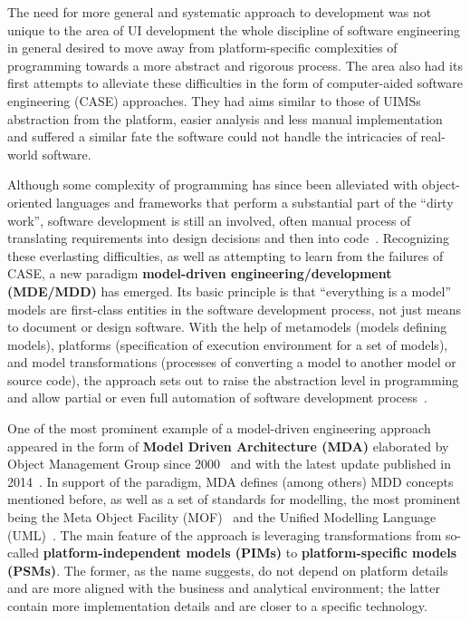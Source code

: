 The need for more general and systematic approach to development was not unique to the area of UI development\,\textendash\,the whole discipline of software engineering in general desired to move away from platform-specific complexities of programming towards a more abstract and rigorous process.
The area also had its first attempts to alleviate these difficulties in the form of computer-aided software engineering (CASE) approaches.
They had aims similar to those of UIMSs\,\textendash\,abstraction from the platform, easier analysis and less manual implementation\,\textendash\,and suffered a similar fate\,\textendash\,the software could not handle the intricacies of real-world software.

Although some complexity of programming has since been alleviated with object-oriented languages and frameworks that perform a substantial part of the \enquote{dirty work}, software development is still an involved, often manual process of translating requirements into design decisions and then into code~\cite{Schmidt2006}.
Recognizing these everlasting difficulties, as well as attempting to learn from the failures of CASE, a new paradigm\,\textendash\,\textbf{model-driven engineering/development (MDE/MDD)}\,\textendash\,has emerged.
Its basic principle is that \enquote{everything is a model}~\cite{bezivin2004search}\,\textendash\,models are first-class entities in the software development process, not just means to document or design software.
With the help of metamodels (models defining models), platforms (specification of execution environment for a set of models), and model transformations (processes of converting a model to another model or source code), the approach sets out to raise the abstraction level in programming and allow partial or even full automation of software development process~\cite{mellor2004mda}.

One of the most prominent example of a model-driven engineering approach appeared in the form of \textbf{Model Driven Architecture (MDA)} elaborated by Object Management Group since 2000~\cite{richard_soley_model_2000} and with the latest update published in 2014~\cite{mda_2014}.
In support of the paradigm, MDA defines (among others) MDD concepts mentioned before, as well as a set of standards for modelling, the most prominent being the Meta Object Facility (MOF)~ and the Unified Modelling Language (UML)~.
The main feature of the approach is leveraging transformations from so-called \textbf{platform-independent models (PIMs)} to \textbf{platform-specific models (PSMs)}.
The former, as the name suggests, do not depend on platform details and are more aligned with the business and analytical environment;
the latter contain more implementation details and are closer to a specific technology.

